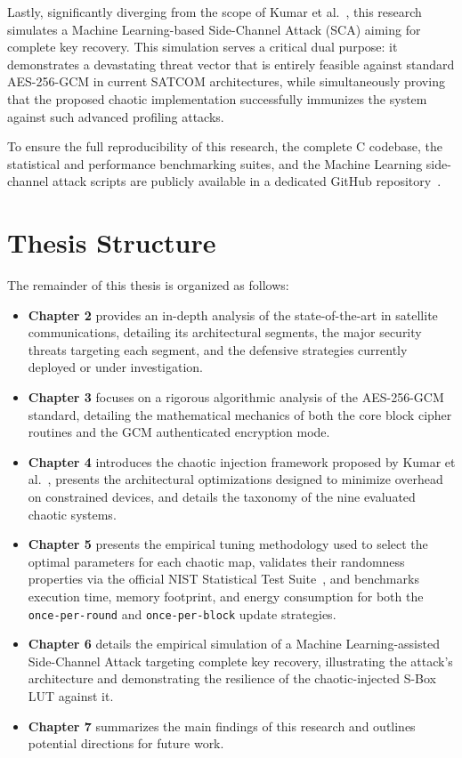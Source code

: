 \documentclass[11pt,a4paper]{report}
\begin{document}
Lastly, significantly diverging from the scope of Kumar et al.~\cite{KumarPaper}, this research simulates a Machine Learning-based Side-Channel Attack (SCA) aiming for complete key recovery. 
This simulation serves a critical dual purpose: it demonstrates a devastating threat vector that is entirely feasible against standard AES-256-GCM in current SATCOM architectures, 
while simultaneously proving that the proposed chaotic implementation successfully immunizes the system against such advanced profiling attacks.

To ensure the full reproducibility of this research, the complete C codebase, the statistical and performance benchmarking suites, 
and the Machine Learning side-channel attack scripts are publicly available in a dedicated GitHub repository~\cite{simodesk_aes_chaotic}.

\section{Thesis Structure}
The remainder of this thesis is organized as follows:
\begin{itemize}
    \item \textbf{Chapter 2} provides an in-depth analysis of the state-of-the-art in satellite communications, detailing its architectural segments, 
    the major security threats targeting each segment, and the defensive strategies currently deployed or under investigation.
    
    \item \textbf{Chapter 3} focuses on a rigorous algorithmic analysis of the AES-256-GCM standard, detailing the mathematical mechanics of both the core block cipher routines and the GCM authenticated encryption mode.
    
    \item \textbf{Chapter 4} introduces the chaotic injection framework proposed by Kumar et al.~\cite{KumarPaper}, 
    presents the architectural optimizations designed to minimize overhead on constrained devices, and details the taxonomy of the nine evaluated chaotic systems.
    
    \item \textbf{Chapter 5} presents the empirical tuning methodology used to select the optimal parameters for each chaotic map, 
    validates their randomness properties via the official NIST Statistical Test Suite~\cite{NISTRandomnessTestSuite}, 
    and benchmarks execution time, memory footprint, and energy consumption for both the \texttt{once-per-round} and \texttt{once-per-block} update strategies.
    
    \item \textbf{Chapter 6} details the empirical simulation of a Machine Learning-assisted Side-Channel Attack targeting complete key recovery, 
    illustrating the attack's architecture and demonstrating the resilience of the chaotic-injected S-Box LUT against it.
    
    \item \textbf{Chapter 7} summarizes the main findings of this research and outlines potential directions for future work.
\end{itemize}
\end{document}
